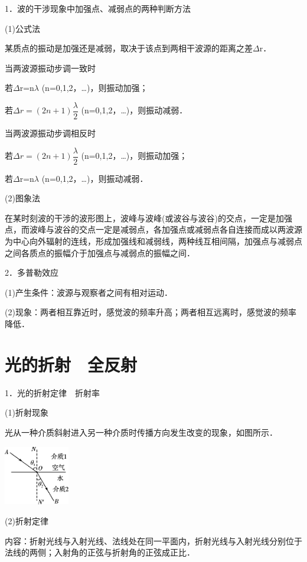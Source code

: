 1．波的干涉现象中加强点、减弱点的两种判断方法

(1)公式法

某质点的振动是加强还是减弱，取决于该点到两相干波源的距离之差$\Delta$r．

当两波源振动步调一致时

若$\Delta$r=n$\lambda$ (n=0,1,2，\ldots)，则振动加强；

若$\Delta r=(2n+1)\dfrac{\lambda}{2}$ (n=0,1,2，\ldots)，则振动减弱．

当两波源振动步调相反时

若$\Delta r=(2n+1)\dfrac{\lambda}{2}$ (n=0,1,2，\ldots)，则振动加强；

若$\Delta$r=n$\lambda$ (n=0,1,2，\ldots)，则振动减弱．

(2)图象法

在某时刻波的干涉的波形图上，波峰与波峰(或波谷与波谷)的交点，一定是加强点，而波峰与波谷的交点一定是减弱点，各加强点或减弱点各自连接而成以两波源为中心向外辐射的连线，形成加强线和减弱线，两种线互相间隔，加强点与减弱点之间各质点的振幅介于加强点与减弱点的振幅之间．

2．多普勒效应

(1)产生条件：波源与观察者之间有相对运动．

(2)现象：两者相互靠近时，感觉波的频率升高；两者相互远离时，感觉波的频率降低．

\newpage
\section{光的折射　全反射}



1．光的折射定律　折射率

(1)折射现象

光从一种介质斜射进入另一种介质时传播方向发生改变的现象，如图所示．

\begin{center}\includegraphics[width=1.12292in,height=1.01875in]{media/image545.png}\end{center}

(2)折射定律

内容：折射光线与入射光线、法线处在同一平面内，折射光线与入射光线分别位于法线的两侧；入射角的正弦与折射角的正弦成正比．

